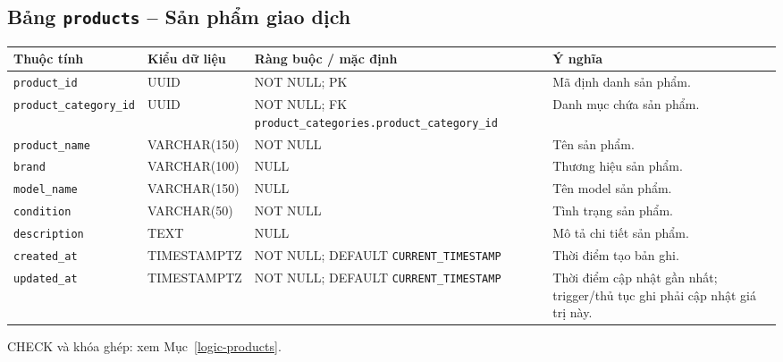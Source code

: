 \subsection{Bảng \texttt{products} -- Sản phẩm giao dịch}
\label{dictionary-products}
\begingroup
\footnotesize
\setlength{\tabcolsep}{3pt}
\begin{longtable}{>{\raggedright\arraybackslash}p{3.1cm}>{\raggedright\arraybackslash}p{2.5cm}>{\raggedright\arraybackslash}p{3.7cm}>{\raggedright\arraybackslash}p{4.3cm}}
\toprule
Thuộc tính & Kiểu dữ liệu & Ràng buộc / mặc định & Ý nghĩa \\
\midrule
\endhead
\texttt{product\_\allowbreak{}id} & UUID & NOT NULL; PK & Mã định danh sản phẩm. \\
\texttt{product\_\allowbreak{}category\_\allowbreak{}id} & UUID & NOT NULL; FK \texttt{product\_\allowbreak{}categories.product\_\allowbreak{}category\_\allowbreak{}id} & Danh mục chứa sản phẩm. \\
\texttt{product\_\allowbreak{}name} & VARCHAR(150) & NOT NULL & Tên sản phẩm. \\
\texttt{brand} & VARCHAR(100) & NULL & Thương hiệu sản phẩm. \\
\texttt{model\_\allowbreak{}name} & VARCHAR(150) & NULL & Tên model sản phẩm. \\
\texttt{condition} & VARCHAR(50) & NOT NULL & Tình trạng sản phẩm. \\
\texttt{description} & TEXT & NULL & Mô tả chi tiết sản phẩm. \\
\texttt{created\_\allowbreak{}at} & TIMESTAMPTZ & NOT NULL; DEFAULT \texttt{CURRENT\_\allowbreak{}TIMESTAMP} & Thời điểm tạo bản ghi. \\
\texttt{updated\_\allowbreak{}at} & TIMESTAMPTZ & NOT NULL; DEFAULT \texttt{CURRENT\_\allowbreak{}TIMESTAMP} & Thời điểm cập nhật gần nhất; trigger/thủ tục ghi phải cập nhật giá trị này. \\
\bottomrule
\end{longtable}
\endgroup
CHECK và khóa ghép: xem Mục~\ref{logic-products}.
